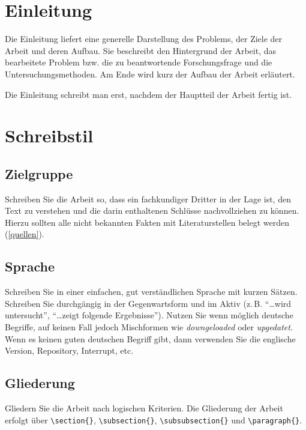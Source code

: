 \documentclass[conference,compsoc,final,a4paper]{IEEEtran}
\begin{document}
    \section{Einleitung}
    Die Einleitung liefert eine generelle Darstellung des Problems, der Ziele der Arbeit und deren Aufbau. Sie beschreibt den Hintergrund der Arbeit, das bearbeitete Problem bzw. die zu beantwortende Forschungsfrage und die Untersuchungsmethoden. Am Ende wird kurz der Aufbau der Arbeit erläutert.

    Die Einleitung schreibt man erst, nachdem der Hauptteil der Arbeit fertig ist.



    \section{Schreibstil}

    \subsection{Zielgruppe}
    Schreiben Sie die Arbeit so, dass ein fachkundiger Dritter in der Lage ist, den Text zu verstehen und die darin enthaltenen Schlüsse nachvollziehen zu können. Hierzu sollten alle nicht bekannten Fakten mit Literaturstellen belegt werden (\autoref{quellen}).

    \subsection{Sprache}
    Schreiben Sie in einer einfachen, gut verständlichen Sprache mit kurzen Sätzen. Schreiben Sie durchgängig in der Gegenwartsform und im Aktiv (z.\,B. \enquote{\dots wird untersucht}, \enquote{\dots zeigt folgende Ergebnisse}). Nutzen Sie wenn möglich deutsche Begriffe, auf keinen Fall jedoch Mischformen wie \emph{downgeloaded} oder \emph{upgedatet}. Wenn es keinen guten deutschen Begriff gibt, dann verwenden Sie die englische Version, \zb{} Repository, Interrupt, etc.

    \subsection{Gliederung}
    Gliedern Sie die Arbeit nach logischen Kriterien. Die Gliederung der Arbeit erfolgt über \verb+\section{}+, \verb+\subsection{}+, \verb+\subsubsection{}+ und \verb+\paragraph{}+.
\end{document}

